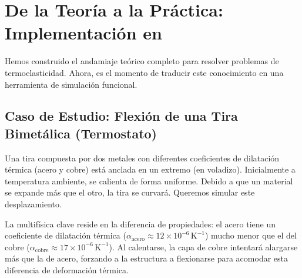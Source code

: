 \section{De la Teoría a la Práctica: Implementación en \fenics}
\label{sec:thermo-fenics}
Hemos construido el andamiaje teórico completo para resolver problemas de termoelasticidad. Ahora, es el momento de traducir este conocimiento en una herramienta de simulación funcional.

\subsection{Caso de Estudio: Flexión de una Tira Bimetálica (Termostato)}
Una tira compuesta por dos metales con diferentes coeficientes de dilatación térmica (acero y cobre) está anclada en un extremo (en voladizo). Inicialmente a temperatura ambiente, se calienta de forma uniforme. Debido a que un material se expande más que el otro, la tira se curvará. Queremos simular este desplazamiento.

La multifísica clave reside en la diferencia de propiedades: el acero tiene un coeficiente de dilatación térmica (\(\alpha_{\text{acero}} \approx 12 \times 10^{-6} \, \text{K}^{-1}\)) mucho menor que el del cobre (\(\alpha_{\text{cobre}} \approx 17 \times 10^{-6} \, \text{K}^{-1}\)). Al calentarse, la capa de cobre intentará alargarse más que la de acero, forzando a la estructura a flexionarse para acomodar esta diferencia de deformación térmica.

